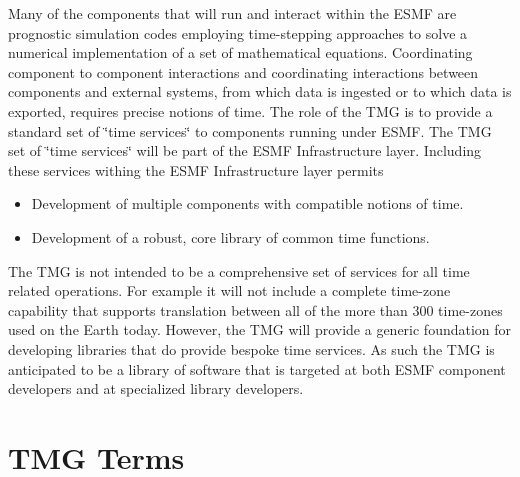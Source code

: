 \documentclass[english]{article}
\newcommand{\abbr}{TMG }
\begin{document}
Many of the components that will run and interact within the ESMF
are prognostic simulation codes employing time-stepping approaches
to solve a numerical implementation of a set of mathematical equations.
Coordinating component to component interactions and coordinating interactions
between components and external systems, from which data is ingested
or to which data is exported, requires precise notions of time. The
role of the \abbr is to provide a standard set of \char`\"{}time services\char`\"{}
to components running under ESMF. The \abbr set of \char`\"{}time services\char`\"{}
will be part of the ESMF Infrastructure layer. Including these services
withing the ESMF Infrastructure layer permits

\begin{itemize}
\item Development of multiple components with compatible notions of time.
\item Development of a robust, core library of common time functions.
\end{itemize}

The \abbr is not intended to be a comprehensive set of services for
all time related operations. For example it will not include a complete
time-zone capability that supports translation between all of the
more than 300 time-zones used on the Earth today. However, the \abbr
will provide a generic foundation for developing libraries that do
provide bespoke time services. As such the \abbr is anticipated to
be a library of software that is targeted at both ESMF component 
developers and at specialized library developers.

\section{\abbr Terms}

\tablefirsthead{}
\tablehead{\Large \bf \abbr Terms cont...\vspace{2mm} \\}
\tabletail{}
\tablelasttail{}
\end{document}
